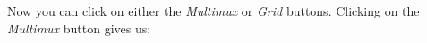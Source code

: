 \documentclass{manual}
\begin{document}
\begin{figure}[ht]
  \centerline{}
  \label{fig:event4}
\end{figure}

\pagebreak

Now you can click on either the \emph{Multimux} or \emph{Grid} buttons.
Clicking on the  \emph{Multimux} button gives us:
\end{document}
